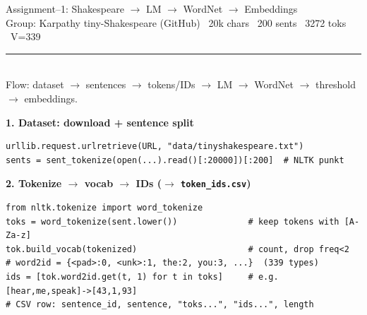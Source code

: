 \documentclass[11pt,a4paper]{article}
\begin{document}
\begin{center}
{\Large Assignment--1: Shakespeare $\to$ LM $\to$ WordNet $\to$ Embeddings}\\[2pt]
{\small Group: \underline{\hspace{3.5cm}}\quad \underline{\hspace{3.5cm}} \quad
Karpathy tiny-Shakespeare (GitHub) \textbar\ 20k chars \textbar\ 200 sents \textbar\ 3272 toks \textbar\ V=339}
\end{center}
\hrule\vspace{4pt}

\begin{center}
\\{\scriptsize Flow: dataset $\to$ sentences $\to$ tokens/IDs $\to$ LM $\to$ WordNet $\to$ threshold $\to$ embeddings.}
\end{center}

\textbf{1. Dataset: download + sentence split}
\begin{lstlisting}
urllib.request.urlretrieve(URL, "data/tinyshakespeare.txt")
sents = sent_tokenize(open(...).read()[:20000])[:200]  # NLTK punkt
\end{lstlisting}

\textbf{2. Tokenize $\to$ vocab $\to$ IDs ($\to$ \texttt{token\_ids.csv})}
\begin{lstlisting}
from nltk.tokenize import word_tokenize
toks = word_tokenize(sent.lower())              # keep tokens with [A-Za-z]
tok.build_vocab(tokenized)                      # count, drop freq<2
# word2id = {<pad>:0, <unk>:1, the:2, you:3, ...}  (339 types)
ids = [tok.word2id.get(t, 1) for t in toks]     # e.g. [hear,me,speak]->[43,1,93]
# CSV row: sentence_id, sentence, "toks...", "ids...", length
\end{lstlisting}
\end{document}
